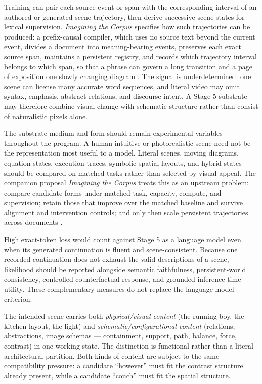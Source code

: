 \documentclass[11pt,a4paper]{article}
\begin{document}
Training can pair each source event or span with the corresponding interval of an authored or generated scene trajectory, then derive successive scene states for lexical supervision. \emph{Imagining the Corpus} specifies how such trajectories can be produced: a prefix-causal compiler, which uses no source text beyond the current event, divides a document into meaning-bearing events, preserves each exact source span, maintains a persistent registry, and records which trajectory interval belongs to which span, so that a phrase can govern a long transition and a page of exposition one slowly changing diagram \cite{documentworld2026}. The signal is underdetermined: one scene can license many accurate word sequences, and literal video may omit syntax, emphasis, abstract relations, and discourse intent. A Stage-5 substrate may therefore combine visual change with schematic structure rather than consist of naturalistic pixels alone.

The substrate medium and form should remain experimental variables throughout the program. A human-intuitive or photorealistic scene need not be the representation most useful to a model. Literal scenes, moving diagrams, equation states, execution traces, symbolic-spatial layouts, and hybrid states should be compared on matched tasks rather than selected by visual appeal. The companion proposal \emph{Imagining the Corpus} treats this as an upstream problem: compare candidate forms under matched task, capacity, compute, and supervision; retain those that improve over the matched baseline and survive alignment and intervention controls; and only then scale persistent trajectories across documents \cite{documentworld2026}.

High exact-token loss would count against Stage 5 as a language model even when its generated continuation is fluent and scene-consistent. Because one recorded continuation does not exhaust the valid descriptions of a scene, likelihood should be reported alongside semantic faithfulness, persistent-world consistency, controlled counterfactual response, and grounded inference-time utility. These complementary measures do not replace the language-model criterion.

The intended scene carries both \emph{physical/visual content} (the running boy, the kitchen layout, the light) and \emph{schematic/configurational content} (relations, abstractions, image schemas \cite{lakoff_johnson} --- containment, support, path, balance, force, contrast) in one working state. The distinction is functional rather than a literal architectural partition. Both kinds of content are subject to the same compatibility pressure: a candidate ``however'' must fit the contrast structure already present, while a candidate ``couch'' must fit the spatial structure.
\end{document}
